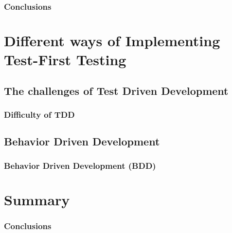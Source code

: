 \documentclass{beamer}
\begin{document}
\begin{frame}
\frametitle{Conclusions}
\end{frame}

\section[Different Implementations of Test-First]{Different ways of Implementing Test-First Testing} 
\subsection{The challenges of Test Driven Development}
\begin{frame}
\frametitle{Difficulty of TDD}
\end{frame}
\subsection{Behavior Driven Development}
\begin{frame}
\frametitle{Behavior Driven Development (BDD)}
\end{frame}


\section[Summary]{Summary}
\begin{frame}
\frametitle{Conclusions}
\end{frame}
\end{document}
